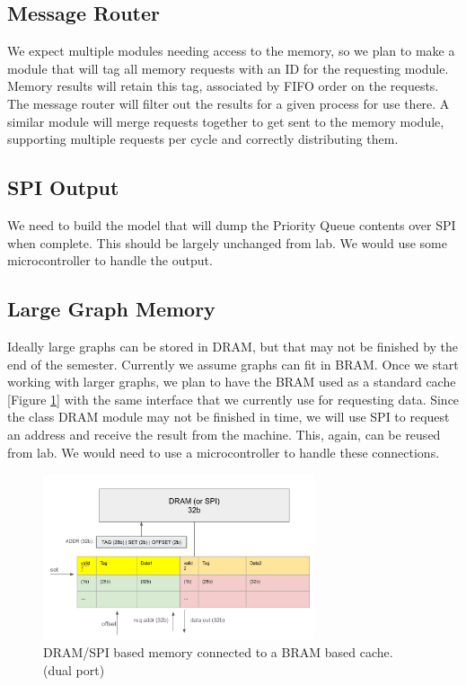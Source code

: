 \documentclass[conference]{IEEEtran}
\begin{document}
\subsection{Message Router}
We expect multiple modules needing access to the memory, so we plan to make a module that will tag all memory requests with an ID for the requesting module. Memory results will retain this tag, associated by FIFO order on the requests. The message router will filter out the results for a given process for use there. A similar module will merge requests together to get sent to the memory module, supporting multiple requests per cycle and correctly distributing them.

\subsection{SPI Output}
We need to build the model that will dump the Priority Queue contents over SPI when complete. This should be largely unchanged from lab. We would use some microcontroller to handle the output.

\subsection{Large Graph Memory}

Ideally large graphs can be stored in DRAM, but that may not be finished by the end of the semester. Currently we assume graphs can fit in BRAM. Once we start working with larger graphs, we plan to have the BRAM used as a standard cache [Figure \ref{cachefig}] with the same interface that we currently use for requesting data. Since the class DRAM module may not be finished in time, we will use SPI to request an address and receive the result from the machine. This, again, can be reused  from lab. We would need to use a microcontroller to handle these connections.

\begin{figure}[htbp]
\centerline{\includegraphics[width=8cm]{cache.png}}
\caption{DRAM/SPI based memory connected to a BRAM based cache. (dual port)}
\label{cachefig}
\end{figure}
\end{document}
